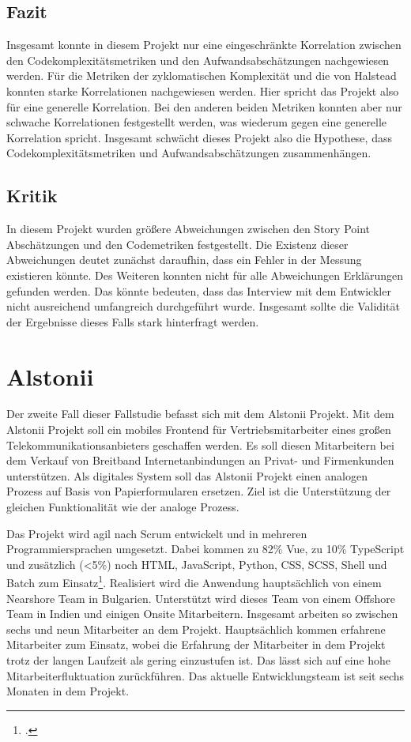 \subsection{Fazit}\label{ingrid-fazit}

Insgesamt konnte in diesem Projekt nur eine eingeschränkte Korrelation
zwischen den Codekomplexitätsmetriken und den Aufwandsabschätzungen
nachgewiesen werden. Für die Metriken der zyklomatischen Komplexität und
die von Halstead konnten starke Korrelationen nachgewiesen werden. Hier
spricht das Projekt also für eine generelle Korrelation. Bei den anderen
beiden Metriken konnten aber nur schwache Korrelationen festgestellt
werden, was wiederum gegen eine generelle Korrelation spricht. Insgesamt
schwächt dieses Projekt also die Hypothese, dass
Codekomplexitätsmetriken und Aufwandsabschätzungen zusammenhängen.

\subsection{Kritik}\label{ingrid-kritik}

In diesem Projekt wurden größere Abweichungen zwischen den Story Point
Abschätzungen und den Codemetriken festgestellt. Die Existenz dieser
Abweichungen deutet zunächst daraufhin, dass ein Fehler in der Messung
existieren könnte. Des Weiteren konnten nicht für alle Abweichungen
Erklärungen gefunden werden. Das könnte bedeuten, dass das Interview mit
dem Entwickler nicht ausreichend umfangreich durchgeführt wurde.
Insgesamt sollte die Validität der Ergebnisse dieses Falls stark
hinterfragt werden.

\section{Alstonii}\label{alstonii}

Der zweite Fall dieser Fallstudie befasst sich mit dem Alstonii
Projekt. Mit dem Alstonii Projekt soll ein mobiles Frontend für
Vertriebsmitarbeiter eines großen Telekommunikationsanbieters geschaffen
werden. Es soll diesen Mitarbeitern bei dem Verkauf von Breitband
Internetanbindungen an Privat- und Firmenkunden unterstützen. Als
digitales System soll das Alstonii Projekt einen analogen Prozess auf Basis
von Papierformularen ersetzen. Ziel ist die Unterstützung der gleichen
Funktionalität wie der analoge Prozess.

Das Projekt wird agil nach Scrum entwickelt und in mehreren
Programmiersprachen umgesetzt. Dabei kommen zu 82\% Vue, zu 10\%
TypeScript und zusätzlich (\textless5\%) noch HTML, JavaScript, Python,
CSS, SCSS, Shell und Batch zum Einsatz\footcite[Vgl. ][]{Sourcecode}. Realisiert
wird die Anwendung hauptsächlich von einem Nearshore Team in Bulgarien.
Unterstützt wird dieses Team von einem Offshore Team in Indien und
einigen Onsite Mitarbeitern. Insgesamt arbeiten so zwischen sechs und
neun Mitarbeiter an dem Projekt. Hauptsächlich kommen erfahrene
Mitarbeiter zum Einsatz, wobei die Erfahrung der Mitarbeiter in dem
Projekt trotz der langen Laufzeit als gering einzustufen ist. Das lässt
sich auf eine hohe Mitarbeiterfluktuation zurückführen. Das aktuelle
Entwicklungsteam ist seit sechs Monaten in dem Projekt.

